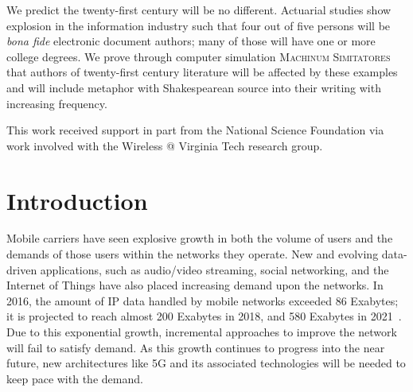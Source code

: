 \documentclass[12pt,dvipsnames]{report}
\begin{document}
We predict the twenty-first century will be no different.  Actuarial
studies show explosion in the information industry such that four out
of five persons will be \textit{bona fide} electronic document
authors; many of those will have one or more college degrees.  We
prove through computer simulation \textsc{Machinum Simitatores} that
authors of twenty-first century literature will be affected by these
examples and will include metaphor with Shakespearean source into
their writing with increasing frequency.
\fi

\vfill


This work received support in part from the National Science Foundation via work involved with the Wireless @ Virginia Tech research group.

\pagebreak


\tableofcontents
\pagebreak

\listoffigures
\pagebreak

\listoftables
\pagebreak

\pagestyle{myheadings}

\iftrue
\chapter{Introduction} \label{ch:intro}

Mobile carriers have seen explosive growth in both the volume of users and the demands of those users within the networks they operate.  New and evolving data-driven applications, such as audio/video streaming, social networking, and the Internet of Things have also placed increasing demand upon the networks.  In 2016, the amount of IP data handled by mobile networks exceeded 86 Exabytes; it is projected to reach almost 200 Exabytes in 2018, and 580 Exabytes in 2021~\cite{ciscoVNI2017}.  Due to this exponential growth, incremental approaches to improve the network will fail to satisfy demand.  As this growth continues to progress into the near future, new architectures like 5G and its associated technologies will be needed to keep pace with the demand.
\end{document}
